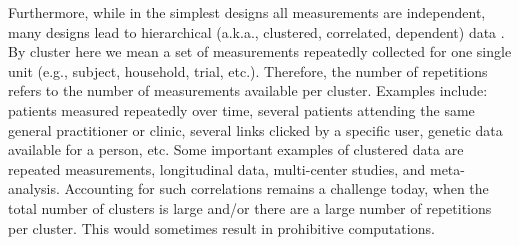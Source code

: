\documentclass[14pt]{article}
\begin{document}
Furthermore, while in the simplest designs all measurements are independent, many designs lead to hierarchical (a.k.a., clustered, correlated, dependent) data \citep{laird1982,zeger1986,verbeke2009, molenberghs2005}. By cluster here we mean a set of measurements repeatedly collected for one single unit (e.g., subject, household, trial, etc.). Therefore, the number of repetitions refers to the number of measurements available per cluster. Examples include: patients measured repeatedly over time, several patients attending the same general practitioner or clinic, several links clicked by a specific user, genetic data available for a person, etc. Some important examples of clustered data are repeated measurements, longitudinal data, multi-center studies, and meta-analysis. Accounting for such correlations remains a challenge today, when the total number of clusters is large and/or there are a large number of repetitions per cluster. This would sometimes result in prohibitive computations. 
\end{document}
